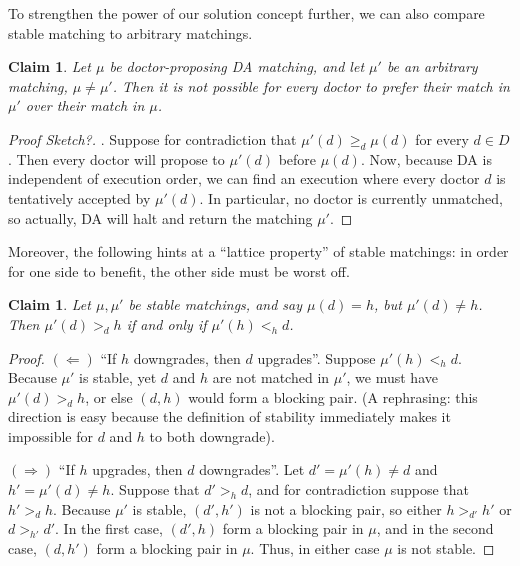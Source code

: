 \documentclass[12pt]{article}
\newtheorem{claim}[definition]{Claim}
\begin{document}
To strengthen the power of our solution concept further,
we can also compare stable matching to arbitrary matchings.
\begin{claim}\label{claimBetterThanAllMatchings}
  Let $\mu$ be doctor-proposing DA matching, and let $\mu'$ be an arbitrary
  matching, $\mu\ne\mu'$.
  Then it is not possible for every doctor to prefer their match in
  $\mu'$ over their match in $\mu$.
\end{claim}
\begin{proof}[Proof Sketch?].
  Suppose for contradiction that $\mu'(d) \ge_d \mu(d)$ for every $d\in D$.
  Then every doctor will propose to $\mu'(d)$ before $\mu(d)$.
  Now, because DA is independent of execution order, we can find an execution
  where every doctor $d$ is tentatively accepted by $\mu'(d)$.
  In particular, no doctor is currently unmatched,
  so actually, DA will halt and return the matching $\mu'$.
\end{proof}

Moreover, the following hints at a ``lattice property'' of stable matchings:
in order for one side to benefit, the other side must be worst off.
\begin{claim}
  Let $\mu, \mu'$ be stable matchings, and say $\mu(d) = h$, but $\mu'(d)\ne h$.
  Then $\mu'(d) >_d h$ if and only if $\mu'(h) <_h d$.
\end{claim}
\begin{proof}
  $(\Leftarrow)$ ``If $h$ downgrades, then $d$ upgrades''.
  Suppose $\mu'(h) <_h d$. Because $\mu'$ is stable, yet $d$ and $h$
  are not matched in $\mu'$, we must have $\mu'(d) >_d h$,
  or else $(d,h)$ would form a blocking pair.
  (A rephrasing: this direction is easy because the definition of stability
  immediately makes it impossible for $d$ and $h$ to both downgrade).

  $(\Rightarrow)$ ``If $h$ upgrades, then $d$ downgrades''.
  Let $d' = \mu'(h) \ne d$ and $h' = \mu'(d) \ne h$.
  Suppose that $d' >_h d$, and for contradiction suppose that $h' >_d h$.
  Because $\mu'$ is stable, $(d', h')$ is not a blocking pair,
  so either $h >_{d'} h'$ or $d>_{h'} d'$.
  In the first case, $(d',h)$ form a blocking pair in $\mu$,
  and in the second case, $(d,h')$ form a blocking pair in $\mu$.
  Thus, in either case $\mu$ is not stable.


\end{proof}
\end{document}
